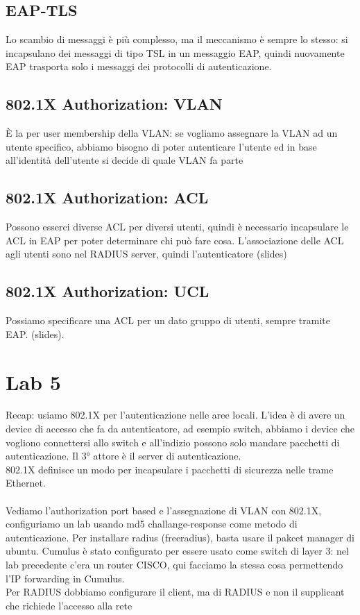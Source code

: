 \documentclass[12pt, oneside]{extbook} %
\begin{document}
\subsection{EAP-TLS}
Lo scambio di messaggi è più complesso, ma il meccanismo è sempre lo stesso: si incapsulano dei messaggi di tipo TSL in un messaggio EAP, quindi nuovamente EAP trasporta solo i messaggi dei protocolli di autenticazione.
\subsection{802.1X Authorization: VLAN}
È la per user membership della VLAN: se vogliamo assegnare la VLAN ad un utente specifico, abbiamo bisogno di poter autenticare l'utente ed in base all'identità dell'utente si decide di quale VLAN fa parte
\subsection{802.1X Authorization: ACL}
Possono esserci diverse ACL per diversi utenti, quindi è necessario incapsulare le ACL in EAP per poter determinare chi può fare cosa. L'associazione delle ACL agli utenti sono nel RADIUS server, quindi l'autenticatore (slides)
\subsection{802.1X Authorization: UCL}
Possiamo specificare una ACL per un dato gruppo di utenti, sempre tramite EAP.
(slides).
\section*{Lab 5}
Recap: usiamo 802.1X per l'autenticazione nelle aree locali. L'idea è di avere un device di accesso che fa da autenticatore, ad esempio switch, abbiamo i device che vogliono connettersi allo switch e all'indizio possono solo mandare pacchetti di autenticazione. Il 3° attore è il server di autenticazione.\\ 802.1X definisce un modo per incapsulare i pacchetti di sicurezza nelle trame Ethernet.\\\\ Vediamo l'authorization port based e l'assegnazione di VLAN con 802.1X, configuriamo un lab usando md5 challange-response come metodo di autenticazione. Per installare radius (freeradius), basta usare il pakcet manager di ubuntu. Cumulus è stato configurato per essere usato come switch di layer 3: nel lab precedente c'era un router CISCO, qui facciamo la stessa cosa permettendo l'IP forwarding in Cumulus.\\ Per RADIUS dobbiamo configurare il client, ma di RADIUS e non il supplicant che richiede l'accesso alla rete
\end{document}
